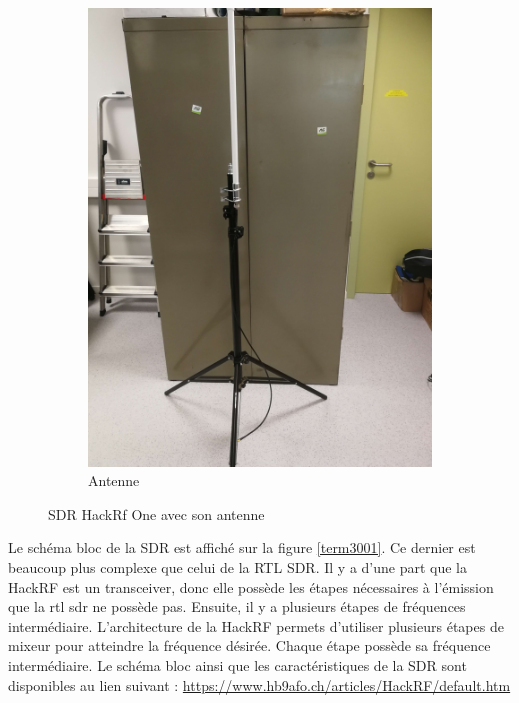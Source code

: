 \begin{figure}[h]
\hspace{0.5cm} %
\begin{subfigure}{0.4\textwidth}
  \centering
  \includegraphics[width=\textwidth]{images/pied.png}
  \caption{Antenne}
  \label{term340}
\end{subfigure}
\caption{SDR HackRf One avec son antenne}
\label{bothimages}
\end{figure}


Le schéma bloc de la SDR est affiché sur la figure \ref{term3001}. Ce dernier est beaucoup plus complexe que celui de la RTL SDR. Il y a d'une part que la HackRF est un transceiver, donc elle possède les étapes nécessaires à l'émission que la rtl sdr ne possède pas. Ensuite, il y a plusieurs étapes de fréquences intermédiaire. L'architecture de la HackRF permets d'utiliser plusieurs étapes de mixeur pour atteindre la fréquence désirée. Chaque étape possède sa fréquence intermédiaire. Le schéma bloc ainsi que les caractéristiques de la SDR sont disponibles au lien suivant : \href{https://www.hb9afo.ch/articles/HackRF/default.htm}{https://www.hb9afo.ch/articles/HackRF/default.htm}

